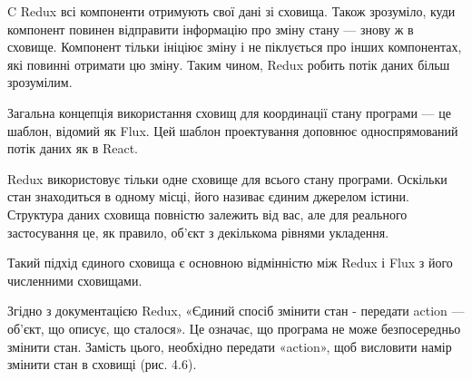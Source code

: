 C Redux всі компоненти отримують свої дані зі сховища. Також зрозуміло, куди компонент повинен відправити інформацію про зміну стану — знову ж в сховище. Компонент тільки ініціює зміну і не піклується про інших компонентах, які повинні отримати цю зміну. Таким чином, Redux робить потік даних більш зрозумілим.

Загальна концепція використання сховищ для координації стану програми — це шаблон, відомий як Flux. Цей шаблон проектування доповнює односпрямований потік даних як в React.

Redux використовує тільки одне сховище для всього стану програми. Оскільки стан знаходиться в одному місці, його називає єдиним джерелом істини. Структура даних сховища повністю залежить від вас, але для реального застосування це, як правило, об'єкт з декількома рівнями укладення.

Такий підхід єдиного сховища є основною відмінністю між Redux і Flux з його численними сховищами.

Згідно з документацією Redux, «Єдиний спосіб змінити стан - передати action — об'єкт, що описує, що сталося». Це означає, що програма не може безпосередньо змінити стан. Замість цього, необхідно передати «action», щоб висловити намір змінити стан в сховищі (рис. 4.6).
